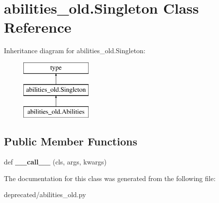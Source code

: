 \hypertarget{classabilities__old_1_1_singleton}{}\section{abilities\+\_\+old.\+Singleton Class Reference}
\label{classabilities__old_1_1_singleton}
Inheritance diagram for abilities\+\_\+old.\+Singleton\+:\begin{figure}[H]
\begin{center}
\leavevmode
\includegraphics[height=3.000000cm]{classabilities__old_1_1_singleton}
\end{center}
\end{figure}
\subsection*{Public Member Functions}
\begin{DoxyCompactItemize}
\item 
def {\bfseries \+\_\+\+\_\+call\+\_\+\+\_\+} (cls, args, kwargs)\hypertarget{classabilities__old_1_1_singleton_a4ddd79ab5ff5c498eba711693507d60b}{}\label{classabilities__old_1_1_singleton_a4ddd79ab5ff5c498eba711693507d60b}

\end{DoxyCompactItemize}


The documentation for this class was generated from the following file\+:\begin{DoxyCompactItemize}
\item 
deprecated/abilities\+\_\+old.\+py\end{DoxyCompactItemize}
